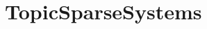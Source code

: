 \hypertarget{group___topic_sparse_systems}{}\section{Topic\+Sparse\+Systems}
\label{group___topic_sparse_systems}
